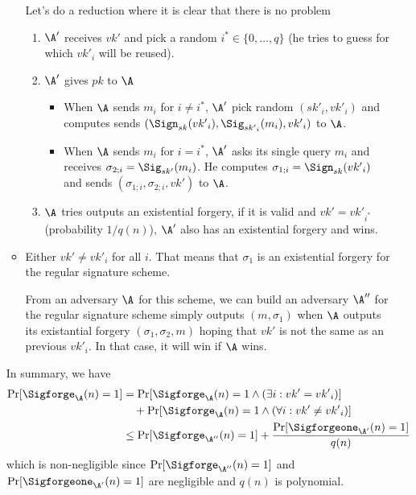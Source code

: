 \begin{solution}
\begin{enumerate}
\begin{itemize}
			Let's do a reduction where it is clear that there is no problem
			\begin{enumerate}
				\item $\A'$ receives $vk'$ and pick a random $i^* \in \{0, \ldots, q\}$ (he tries to guess for which ${vk'}_i$ will be reused).
				\item $\A'$ gives $pk$ to $\A$
				\begin{itemize}
					\item When $\A$ sends $m_i$ for $i \neq i^*$, $\A'$ pick random $({sk'}_i, {vk'}_i)$ and
					computes sends $(\Sign_{sk}({vk'}_i), \Sig_{{sk'}_i}(m_i), {vk'}_i)$ to $\A$.
					\item When $\A$ sends $m_i$ for $i = i^*$, $\A'$ asks its single query $m_i$ and receives $\sigma_{2;i} = \Sig_{sk'}(m_i)$.
					He computes $\sigma_{1;i} = \Sign_{sk}({vk'}_i)$ and sends $(\sigma_{1;i}, \sigma_{2;i}, vk')$ to $\A$.
				\end{itemize}
				\item $\A$ tries outputs an existential forgery, if it is valid and $vk' = {vk'}_{i^*}$ (probability $1/q(n)$),
				$\A'$ also has an existential forgery and wins.
			\end{enumerate}
			\item
			Either $vk' \neq {vk'}_i$ for all $i$.
			That means that $\sigma_1$ is an existential forgery for the regular signature scheme.
			
			From an adversary $\A$ for this scheme, we
			can build an adversary $\A''$ for the regular signature scheme
			simply outputs $(m,\sigma_1)$ when $\A$ outputs its
			existantial forgery $(\sigma_1, \sigma_2, m)$
			hoping that $vk'$ is not the same as an previous ${vk'}_i$.
			In that case, it will win if $\A$ wins.
		\end{itemize}
		
		In summary, we have
		\begin{align*}
			\Pr[\Sigforge_{\A}(n) = 1]
			& = \Pr[\Sigforge_{\A}(n) = 1 \land (\exists i: vk' = {vk'}_i)]\\
			& \quad + \Pr[\Sigforge_{\A}(n) = 1 \land (\forall i: vk' \neq {vk'}_i)]\\
			& \leq \Pr[\Sigforge_{\A''}(n) = 1] + \frac{\Pr[\Sigforgeone_{\A'}(n) = 1]}{q(n)}
		\end{align*}
		which is non-negligible since $\Pr[\Sigforge_{\A''}(n) = 1]$ and $\Pr[\Sigforgeone_{\A'}(n) = 1]$ are negligible and $q(n)$ is polynomial.
	\end{enumerate}
\end{solution}



